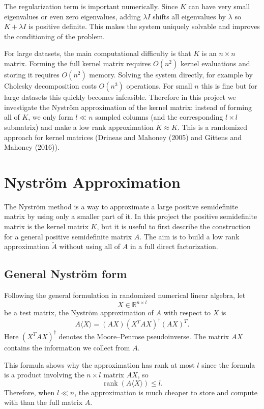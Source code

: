 \documentclass[11pt,a4paper]{article}
\begin{document}
The regularization term is important numerically. Since $K$ can have very small eigenvalues or even zero eigenvalues, adding $\lambda I$ shifts all eigenvalues by $\lambda$ so $K+\lambda I$ is positive definite. This makes the system uniquely solvable and improves the conditioning of the problem.

For large datasets, the main computational difficulty is that $K$ is an $n \times n$ matrix. Forming the full kernel matrix requires $O(n^2)$ kernel evaluations and storing it requires $O(n^2)$ memory. Solving the system directly, for example by Cholesky decomposition costs $O(n^3)$ operations. For small $n$ this is fine but for large datasets this quickly becomes infeasible. Therefore in this project we investigate the Nystr\"om approximation of the kernel matrix: instead of forming all of $K$, we only form $l\ll n$ sampled columns (and the corresponding $l\times l$ submatrix) and make a low rank approximation $\tilde K\approx K$. This is a randomized approach for kernel matrices (Drineas and Mahoney (2005) and Gittens and Mahoney (2016)).

\section{Nystr\"om Approximation}

The Nystr\"om method is a way to approximate a large positive semidefinite matrix by using only a smaller part of it. In this project the positive semidefinite matrix is the kernel matrix $K$, but it is useful to first describe the construction for a general positive semidefinite matrix $A$. The aim is to build a low rank approximation $\tilde{A}$ without using all of $A$ in a full direct factorization.

\subsection{General Nystr\"om form}

Following the general formulation in randomized numerical linear algebra, let
\[
X \in \mathbb{R}^{n \times l}
\]
be a test matrix, the Nystr\"om approximation of $A$ with respect to $X$ is
\[
A\langle X\rangle=(AX)(X^TAX)^\dagger(AX)^T.
\]
Here $(X^TAX)^\dagger$ denotes the Moore--Penrose pseudoinverse. The matrix $AX$ contains the information we collect from $A$.

This formula shows why the approximation has rank at most $l$ since the formula is a product involving the $n \times l$ matrix $AX$, so
\[
\operatorname{rank}(A\langle X\rangle) \leq l.
\]
Therefore, when $l \ll n$, the approximation is much cheaper to store and compute with than the full matrix $A$.
\end{document}
